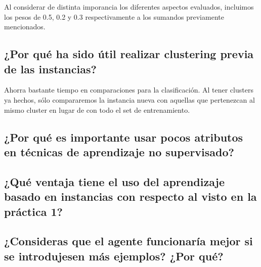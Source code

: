 \documentclass[12pt]{article}
\begin{document}
Al considerar de distinta imporancia los diferentes aspectos evaluados, incluimos los pesos de 0.5, 0.2 y 0.3 respectivamente a los sumandos previamente mencionados.



\subsection{¿Por qué ha sido útil realizar clustering previa de las instancias?}


Ahorra bastante tiempo en comparaciones para la clasificación. Al tener clusters ya hechos, sólo compararemos la instancia nueva con aquellas que pertenezcan al mismo cluster en lugar de con todo el set de entrenamiento.

\subsection{¿Por qué es importante usar pocos atributos en técnicas de aprendizaje no supervisado?}


\subsection{¿Qué ventaja tiene el uso del aprendizaje basado en instancias con respecto al visto en la práctica 1?}


\subsection{¿Consideras que el agente funcionaría mejor si se introdujesen más ejemplos? ¿Por qué?}
\end{document}
